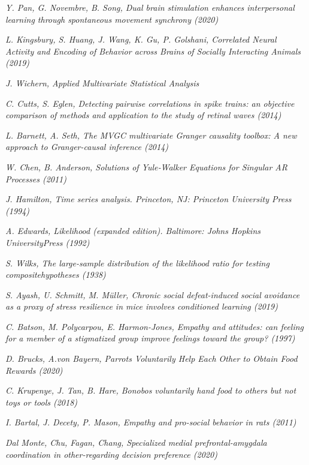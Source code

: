 \documentclass[12pt, a4paper]{report}
\begin{document}
\begin{thebibliography}{50}
	\textit{Y. Pan, G. Novembre, B. Song, Dual brain stimulation enhances interpersonal
		learning through spontaneous movement synchrony (2020)}
	
	\textit{L. Kingsbury, S. Huang, J. Wang,
		K. Gu, P. Golshani, Correlated Neural Activity and Encoding of Behavior
		across Brains of Socially Interacting Animals (2019)}
	
	\textit{J. Wichern, Applied Multivariate Statistical Analysis}
	
	\textit{C. Cutts, S. Eglen, Detecting pairwise correlations in spike trains: an objective comparison of methods and application to the study of retinal waves (2014)}
	
	\textit{L. Barnett, A. Seth, The MVGC multivariate Granger causality toolbox: A new approach to Granger-causal inference (2014)}
	
	\textit{W. Chen, B. Anderson, Solutions of Yule‐Walker Equations for Singular AR Processes (2011)}
	
	\textit{J. Hamilton, Time series analysis. Princeton, NJ: Princeton University Press (1994)}
	
	\textit{A. Edwards, Likelihood (expanded edition). Baltimore: Johns Hopkins UniversityPress (1992)}
	
	\textit{S. Wilks, The large-sample distribution of the likelihood ratio for testing compositehypotheses (1938)}
	
	\textit{S. Ayash, U. Schmitt, M. Müller, Chronic social defeat-induced social avoidance as a proxy of stress resilience in mice involves conditioned learning  (2019)}
	
	\textit{C. Batson, M. Polycarpou, E. Harmon-Jones, Empathy and attitudes: can feeling for a member of a stigmatized group improve feelings toward the group?  (1997)}
	
	\textit{D. Brucks,
		A.von Bayern, Parrots Voluntarily Help Each Other to Obtain Food
		Rewards (2020)}
	
	\textit{C. Krupenye, J. Tan, B. Hare, Bonobos voluntarily hand food to others
		but not toys or tools (2018)}
	
	\textit{
		I. Bartal, J. Decety, P. Mason, Empathy and pro-social behavior in rats  (2011)}
	
	\textit{Dal Monte, Chu, Fagan, Chang, Specialized medial prefrontal-amygdala coordination in other-regarding decision preference (2020)}
	

\end{thebibliography}
\end{document}
